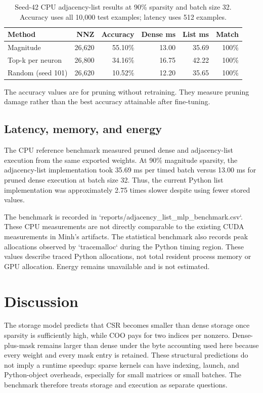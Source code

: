 \documentclass[11pt]{article}
\begin{document}
\begin{table}[ht]
\centering
\caption{Seed-42 CPU adjacency-list results at 90\% sparsity and batch size
32. Accuracy uses all 10,000 test examples; latency uses 512 examples.}
\label{tab:adjacency90}
\small
\begin{tabular}{lrrrrr}
\toprule
Method & NNZ & Accuracy & Dense ms & List ms & Match \\
\midrule
Magnitude & 26,620 & 55.10\% & 13.00 & 35.69 & 100\% \\
Top-k per neuron & 26,800 & 34.16\% & 16.75 & 42.22 & 100\% \\
Random (seed 101) & 26,620 & 10.52\% & 12.20 & 35.65 & 100\% \\
\bottomrule
\end{tabular}
\end{table}

The accuracy values are for pruning without retraining.  They measure pruning
damage rather than the best accuracy attainable after fine-tuning.

\subsection{Latency, memory, and energy}

The CPU reference benchmark measured pruned dense and adjacency-list execution
from the same exported weights.  At 90\% magnitude sparsity, the adjacency-list
implementation took 35.69 ms per timed batch versus 13.00 ms for pruned dense
execution at batch size 32.  Thus, the current Python list implementation was
approximately 2.75 times slower despite using fewer stored values.

The benchmark is recorded in
`reports/adjacency_list_mlp_benchmark.csv`.  These CPU measurements are not
directly comparable to the existing CUDA measurements in Minh's artifacts.
The statistical benchmark also records peak allocations observed by
`tracemalloc` during the Python timing region.  These values describe traced
Python allocations, not total resident process memory or GPU allocation.
Energy remains unavailable and is not estimated.

\section{Discussion}

The storage model predicts that CSR becomes smaller than dense storage once
sparsity is sufficiently high, while COO pays for two indices per nonzero.
Dense-plus-mask remains larger than dense under the byte accounting used here
because every weight and every mask entry is retained.  These structural
predictions do not imply a runtime speedup: sparse kernels can have indexing,
launch, and Python-object overheads, especially for small matrices or small
batches.  The benchmark therefore treats storage and execution as separate
questions.
\end{document}

